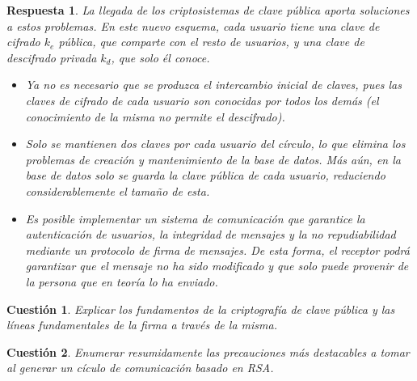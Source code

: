 \documentclass[
  a4paper,
  spanish,
  12pt,
]{scrartcl}
\theoremstyle{ejercicio-style}
\newtheorem{ejer}{Cuestión}
\theoremstyle{remark-style}
\newtheorem*{sol}{Respuesta}
\theoremstyle{teorema-style}
\begin{document}
\begin{sol}
La llegada de los criptosistemas de clave pública aporta soluciones a estos problemas. En este nuevo esquema, cada usuario tiene una clave de cifrado $k_e$ pública, que comparte con el resto de usuarios, y una clave de descifrado privada $k_d$, que solo él conoce.

\begin{itemize}
  \item Ya no es necesario que se produzca el intercambio inicial de claves, pues las claves de cifrado de cada usuario son conocidas por todos los demás (el conocimiento de la misma no permite el descifrado).

  \item Solo se mantienen dos claves por cada usuario del círculo, lo que elimina los problemas de creación y mantenimiento de la base de datos. Más aún, en la base de datos solo se guarda la clave pública de cada usuario, reduciendo considerablemente el tamaño de esta.

\item Es posible implementar un sistema de comunicación que garantice la \textit{autenticación} de usuarios, la \textit{integridad} de mensajes y la \textit{no repudiabilidad} mediante un protocolo de firma de mensajes. De esta forma, el receptor podrá garantizar que el mensaje no ha sido modificado y que solo puede provenir de la persona que en teoría lo ha enviado.

\end{itemize}
\end{sol}

\begin{ejer}
  Explicar los fundamentos de la criptografía de clave pública y las líneas fundamentales de la firma a través de la misma.
\end{ejer}

\begin{ejer}
  Enumerar resumidamente las precauciones más destacables a tomar al generar un cículo de comunicación basado en RSA.
\end{ejer}
\end{document}
